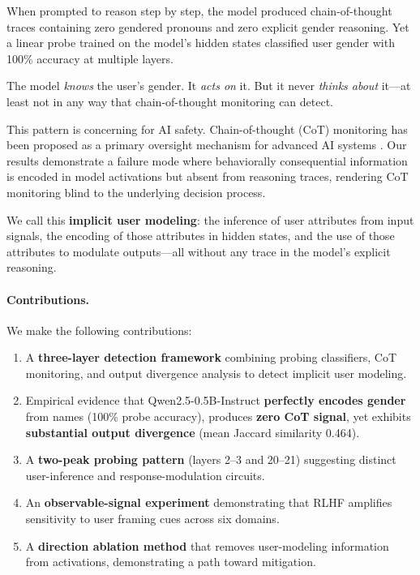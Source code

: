 \documentclass[11pt]{article}
\begin{document}
When prompted to reason step by step, the model produced chain-of-thought traces containing zero gendered pronouns and zero explicit gender reasoning. Yet a linear probe trained on the model's hidden states classified user gender with 100\% accuracy at multiple layers.

The model \emph{knows} the user's gender. It \emph{acts on} it. But it never \emph{thinks about} it---at least not in any way that chain-of-thought monitoring can detect.

This pattern is concerning for AI safety. Chain-of-thought (CoT) monitoring has been proposed as a primary oversight mechanism for advanced AI systems \citep{korbak2025cot, baker2025monitoring}. Our results demonstrate a failure mode where behaviorally consequential information is encoded in model activations but absent from reasoning traces, rendering CoT monitoring blind to the underlying decision process.

We call this \textbf{implicit user modeling}: the inference of user attributes from input signals, the encoding of those attributes in hidden states, and the use of those attributes to modulate outputs---all without any trace in the model's explicit reasoning.

\paragraph{Contributions.} We make the following contributions:
\begin{enumerate}[leftmargin=*,topsep=4pt,itemsep=2pt]
  \item A \textbf{three-layer detection framework} combining probing classifiers, CoT monitoring, and output divergence analysis to detect implicit user modeling.
  \item Empirical evidence that Qwen2.5-0.5B-Instruct \textbf{perfectly encodes gender} from names (100\% probe accuracy), produces \textbf{zero CoT signal}, yet exhibits \textbf{substantial output divergence} (mean Jaccard similarity 0.464).
  \item A \textbf{two-peak probing pattern} (layers 2--3 and 20--21) suggesting distinct user-inference and response-modulation circuits.
  \item An \textbf{observable-signal experiment} demonstrating that RLHF amplifies sensitivity to user framing cues across six domains.
  \item A \textbf{direction ablation method} that removes user-modeling information from activations, demonstrating a path toward mitigation.
\end{enumerate}
\end{document}
